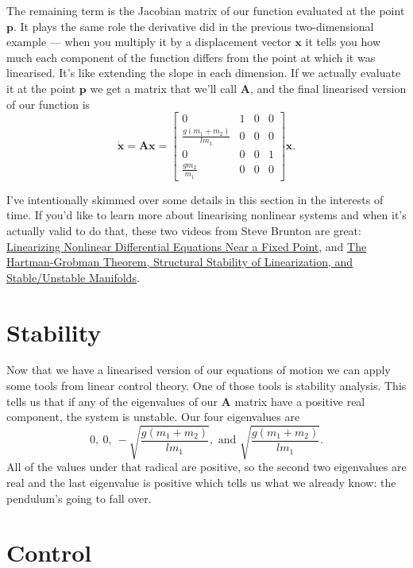 \documentclass{article}
\renewcommand{\vec}[1]{\boldsymbol{\mathbf{#1}}}
\newcommand{\dvec}[1]{\dot{\vec{#1}}}
\begin{document}
The remaining term is the Jacobian matrix of our function evaluated at the point $\vec{p}$. It plays the same role the derivative did in the previous two-dimensional example — when you multiply it by a displacement vector $\vec{x}$ it tells you how much each component of the function differs from the point at which it was linearised. It's like extending the slope in each dimension. If we actually evaluate it at the point $\vec{p}$ we get a matrix that we'll call $\vec{A}$, and the final linearised version of our function is \[\dvec{x} = \vec{A} \vec{x} = \begin{bmatrix}
    0                           & 1 & 0 & 0 \\
    \frac{g (m_1 + m_2)}{l m_1} & 0 & 0 & 0 \\
    0                           & 0 & 0 & 1 \\
    \frac{g m_2}{m_1}           & 0 & 0 & 0
  \end{bmatrix} \vec{x}.\]

I've intentionally skimmed over some details in this section in the interests of time. If you'd like to learn more about linearising nonlinear systems and when it's actually valid to do that, these two videos from Steve Brunton are great: \href{https://www.youtube.com/watch?v=RCWkzzLgwf0}{Linearizing Nonlinear Differential Equations Near a Fixed Point}, and \href{https://www.youtube.com/watch?v=vRaUSnB7qNw}{The Hartman-Grobman Theorem, Structural Stability of Linearization, and Stable/Unstable Manifolds}.

\section{Stability}

Now that we have a linearised version of our equations of motion we can apply some tools from linear control theory. One of those tools is stability analysis. This tells us that if any of the eigenvalues of our $\vec{A}$ matrix have a positive real component, the system is unstable. Our four eigenvalues are \[0, \ 0, \ -\sqrt{\frac{g (m_1 + m_2)}{l m_1}}, \text{ and } \sqrt{\frac{g (m_1 + m_2)}{l m_1}}.\] All of the values under that radical are positive, so the second two eigenvalues are real and the last eigenvalue is positive which tells us what we already know: the pendulum's going to fall over.

\section{Control}
\end{document}
